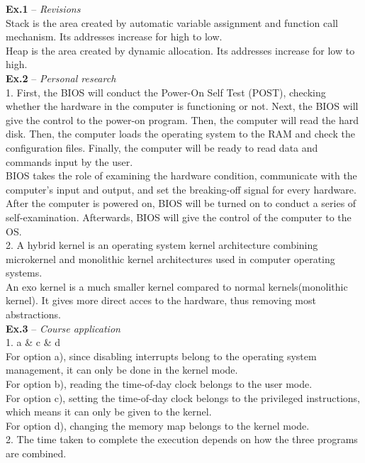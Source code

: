 \documentclass{article}
\begin{document}
\begin{spacing}{2.0}
\newpage
\noindent\textbf{Ex.1} -- \textit{Revisions}\\
Stack is the area created by automatic variable assignment and function call mechanism. Its addresses increase for high to low. \\
Heap is the area created by dynamic allocation. Its addresses increase for low to high.\\
\noindent\textbf{Ex.2} -- \textit{Personal research}\\
1. First, the BIOS will conduct the Power-On Self Test (POST), checking whether the hardware in the computer is functioning or not. Next, the BIOS will give the control to the power-on program. Then, the computer will read the hard disk. Then, the computer loads the operating system to the RAM and check the configuration files. Finally, the computer will be ready to read data and commands input by the user.\\
BIOS takes the role of examining the hardware condition, communicate with the computer's input and output, and set the breaking-off signal for every hardware.\\
After the computer is powered on, BIOS will be turned on to conduct a series of self-examination. Afterwards, BIOS will give the control of the computer to the OS.\\
2. A hybrid kernel is an operating system kernel architecture combining microkernel and monolithic kernel architectures used in computer operating systems.\\
An exo kernel is a much smaller kernel compared to normal kernels(monolithic kernel). It gives more direct acces to the hardware, thus removing most abstractions.\\ 
\noindent\textbf{Ex.3} -- \textit{Course application}\\
1. a \& c \& d\\
For option a), since disabling interrupts belong to the operating system management, it can only be done in the kernel mode.\\
For option b), reading the time-of-day clock belongs to the user mode.\\
For option c), setting the time-of-day clock belongs to the privileged instructions, which means it can only be given to the kernel.\\
For option d), changing the memory map belongs to the kernel mode.\\
2. The time taken to complete the execution depends on how the three programs are combined.\\

\end{spacing}
\end{document}
